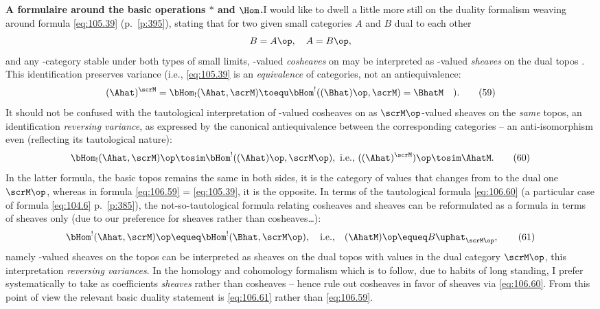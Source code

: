 \label{sec:106}%
%
\textbf{\enspace A formulaire around the
  basic operations $*$ and $\Hom$.}\enspace I would like to dwell a
little more still on the duality formalism weaving around formula
\eqref{eq:105.39} (p.\ \ref{p:395}), stating that for two given small
categories $A$ and $B$ dual to each other
\[B=A\op, \quad A=B\op,\]
and any \scrU-category \scrM{} stable under both types of small
limits, \scrM-valued \emph{cosheaves} on \Ahat{} may be interpreted as
\scrM-valued \emph{sheaves} on the dual topos \Bhat. This
identification preserves variance (i.e., \eqref{eq:105.39} is an
\emph{equivalence} of categories, not an antiequivalence:
\begin{equation}
  \label{eq:106.59}
  (\Ahat)^\scrM = \bHom_!(\Ahat,\scrM) \toequ
  \bHom^!((\Bhat)\op,\scrM) = \BhatM\quad\text{).}\tag{59}
\end{equation}
It should not be confused with the tautological interpretation of
\scrM-valued cosheaves on \Ahat{} as $\scrM\op$-valued sheaves on the
\emph{same} topos, an identification \emph{reversing variance}, as
expressed by the canonical antiequivalence between the corresponding
categories -- an anti-isomorphism even (reflecting its tautological
nature):
\begin{equation}
  \label{eq:106.60}
  \bHom_!(\Ahat,\scrM)\op \tosim \bHom^!((\Ahat)\op,\scrM\op),
  \text{ i.e., }((\Ahat)^\scrM)\op \tosim \AhatM.\tag{60}
\end{equation}
In the latter formula, the basic topos \Ahat{} remains the same in
both sides, it is the category of values that changes from \scrM{} to
the dual one $\scrM\op$, whereas in formula \eqref{eq:106.59} =
\eqref{eq:105.39}, it is the opposite. In terms of the tautological
formula \eqref{eq:106.60} (a particular case of formula
\eqref{eq:104.6} p.\ \ref{p:385}), the not-so-tautological formula
relating cosheaves and sheaves can be reformulated as a formula in
terms of sheaves only (due to our preference for sheaves rather than
cosheaves\ldots):
\begin{equation}
  \label{eq:106.61}
  \bHom^!(\Ahat,\scrM)\op \equeq \bHom^!(\Bhat,\scrM\op),\quad
  \text{i.e.,}\quad (\AhatM)\op \equeq B\uphat_{\scrM\op},\tag{61} 
\end{equation}
namely \scrM-valued sheaves on the topos \Ahat{} can be interpreted as
sheaves on the dual topos with values in the dual category $\scrM\op$,
this interpretation \emph{reversing variances}. In the homology and
cohomology formalism which is to follow, due to habits of long
standing, I prefer systematically to take as coefficients
\emph{sheaves} rather than cosheaves -- hence rule out cosheaves in
favor of sheaves via \eqref{eq:106.60}. From this point of view the
relevant basic duality statement is \eqref{eq:106.61} rather than
\eqref{eq:106.59}.

